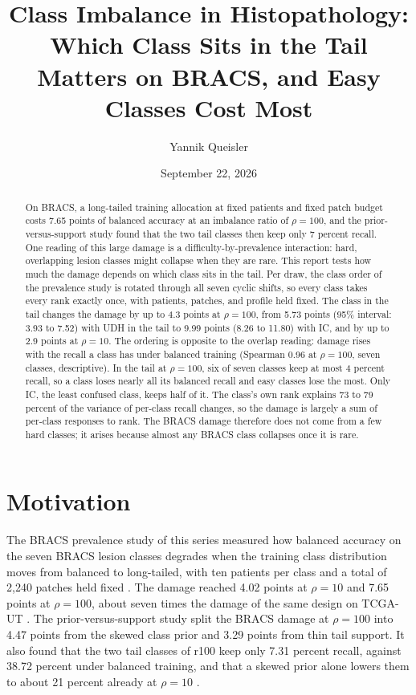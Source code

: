 \documentclass[11pt]{article}
\title{Class Imbalance in Histopathology:\\Which Class Sits in the Tail Matters on BRACS, and Easy Classes Cost Most}
\author{Yannik Queisler}
\date{September 22, 2026}
\begin{document}
\raggedbottom
{}
\setlength{\emergencystretch}{2em}
\maketitle
\begin{abstract}
\noindent On BRACS, a long-tailed training allocation at fixed patients and fixed patch budget costs 7.65 points of balanced accuracy at an imbalance ratio of $\rho=100$, and the prior-versus-support study found that the two tail classes then keep only 7 percent recall. One reading of this large damage is a difficulty-by-prevalence interaction: hard, overlapping lesion classes might collapse when they are rare. This report tests how much the damage depends on which class sits in the tail. Per draw, the class order of the prevalence study is rotated through all seven cyclic shifts, so every class takes every rank exactly once, with patients, patches, and profile held fixed. The class in the tail changes the damage by up to 4.3 points at $\rho=100$, from 5.73 points (95\% interval: 3.93 to 7.52) with UDH in the tail to 9.99 points (8.26 to 11.80) with IC, and by up to 2.9 points at $\rho=10$. The ordering is opposite to the overlap reading: damage rises with the recall a class has under balanced training (Spearman 0.96 at $\rho=100$, seven classes, descriptive). In the tail at $\rho=100$, six of seven classes keep at most 4 percent recall, so a class loses nearly all its balanced recall and easy classes lose the most. Only IC, the least confused class, keeps half of it. The class's own rank explains 73 to 79 percent of the variance of per-class recall changes, so the damage is largely a sum of per-class responses to rank. The BRACS damage therefore does not come from a few hard classes; it arises because almost any BRACS class collapses once it is rare.
\end{abstract}

\section{Motivation}
\label{sec:motivation}
The BRACS prevalence study of this series measured how balanced accuracy on the seven BRACS lesion classes degrades when the training class distribution moves from balanced to long-tailed, with ten patients per class and a total of 2,240 patches held fixed \citep{queisler2026prevalenceBracs}. The damage reached 4.02 points at $\rho=10$ and 7.65 points at $\rho=100$, about seven times the damage of the same design on TCGA-UT \citep{queisler2026prevalenceTcga}. The prior-versus-support study split the BRACS damage at $\rho=100$ into 4.47 points from the skewed class prior and 3.29 points from thin tail support. It also found that the two tail classes of r100 keep only 7.31 percent recall, against 38.72 percent under balanced training, and that a skewed prior alone lowers them to about 21 percent already at $\rho=10$ \citep{queisler2026causeBracs}.
\end{document}
